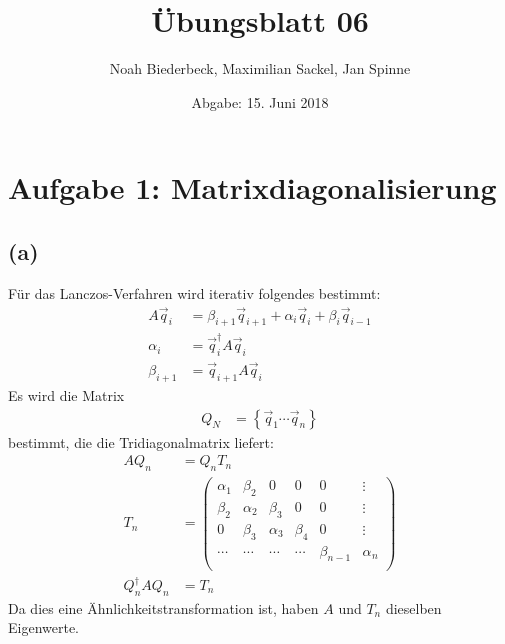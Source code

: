 \documentclass{scrartcl}
\title{Übungsblatt 06}
\author{%
		Noah Biederbeck, Maximilian Sackel, Jan Spinne
}
\date{Abgabe: 15. Juni 2018}
\begin{document}
\maketitle
\section*{Aufgabe 1: Matrixdiagonalisierung}
\subsection*{(a)}
Für das Lanczos-Verfahren wird iterativ folgendes bestimmt:
\begin{align}
  A \vec{q}_{i} &= \beta_{i+1} \vec{q}_{i+1} + \alpha_{i} \vec{q}_{i} + \beta_{i} \vec{q}_{i-1} \\
  \alpha_{i} &= \vec{q}_{i}^{\dagger} A \vec{q}_{i} \\
  \beta_{i+1} &= \vec{q}_{i+1} A \vec{q}_{i}
\end{align}
Es wird die Matrix
\begin{align}
  Q_{N} &= \left\{ \vec{q}_{1} \cdots \vec{q}_{n} \right\}
\end{align}
bestimmt, die die Tridiagonalmatrix liefert:
\begin{align}
  A Q_{n} &= Q_{n} T_{n} \\
  T_{n} &= 
    \left(\begin{matrix}
        \alpha_{1} & \beta_{2}  & 0          & 0         & 0           & \vdots     \\
        \beta_{2}  & \alpha_{2} & \beta_{3}  & 0         & 0           & \vdots     \\
        0          & \beta_{3}  & \alpha_{3} & \beta_{4} & 0           & \vdots     \\
        \cdots     & \cdots     & \cdots     & \cdots    & \beta_{n-1} & \alpha_{_{}n} \\
    \end{matrix}\right) \\
  Q_{n}^{\dagger} A Q_{n} &= T_{n}
\end{align}
Da dies eine Ähnlichkeitstransformation ist, haben $A$ und $T_{n}$ dieselben Eigenwerte.

\end{document}
